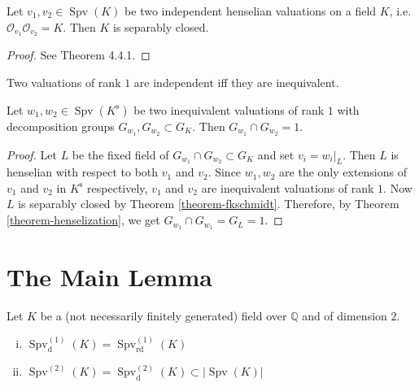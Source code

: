 \begin{theorem}\label{theorem-fkschmidt}
Let $v_1,v_2\in\operatorname{Spv}(K)$ be two independent henselian valuations on a field $K$, i.e. $\mathcal{O}_{v_1}\mathcal{O}_{v_2}=K$. Then $K$ is separably closed.
\end{theorem}

\begin{proof}
See \cite{EP05} Theorem 4.4.1.
\end{proof}

\begin{remark}
Two valuations of rank $1$ are independent iff they are inequivalent.
\end{remark}

\begin{corollary}\label{corollary-fkschmidt}
Let $w_1,w_2\in\operatorname{Spv}(K^\text{s})$ be two inequivalent valuations of rank $1$ with decomposition groups $G_{{w_1}},G_{{w_2}}\subset G_K$. Then $G_{{w_1}}\cap G_{{w_2}}=1$.
\end{corollary}

\begin{proof}
Let $L$ be the fixed field of $G_{w_1}\cap G_{w_2}\subset G_K$ and set $v_i = w_i|_L$. Then $L$ is henselian with respect to both $v_1$ and $v_2$. Since $w_1,w_2$ are the only extensions of $v_1$ and $v_2$ in $K^\text{s}$ respectively, $v_1$ and $v_2$ are inequivalent valuations of rank $1$. Now $L$ is separably closed by Theorem \ref{theorem-fkschmidt}. Therefore, by Theorem \ref{theorem-henselization}, we get $G_{{w_1}}\cap G_{{w_1}}=G_L =1$.
\end{proof}

\section{The Main Lemma}

Let $K$ be a (not necessarily finitely generated) field over $\mathbb{Q}$ and of dimension $2$.

\begin{lemma}\label{lemma-defectless-valuations}
\begin{enumerate}[(i)]
\item $\operatorname{Spv}_\text{d}^{(1)}(K) = \operatorname{Spv}_\text{rd}^{(1)}(K)$
\item $\operatorname{Spv}^{(2)}(K) = \operatorname{Spv}_\text{d}^{(2)}(K)\subset |\operatorname{Spv}(K)|$
\end{enumerate}
\end{lemma}

